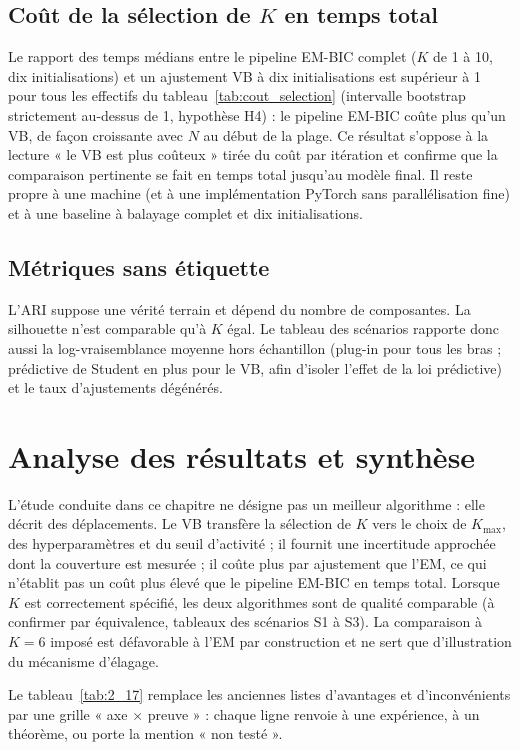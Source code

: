 \subsection{Coût de la sélection de $K$ en temps total}

Le rapport des temps médians entre le pipeline EM-BIC complet ($K$ de 1 à 10, dix initialisations) et un ajustement VB à dix initialisations est supérieur à 1 pour tous les effectifs du tableau~\ref{tab:cout_selection} (intervalle bootstrap strictement au-dessus de 1, hypothèse H4) : le pipeline EM-BIC coûte plus qu'un VB, de façon croissante avec $N$ au début de la plage. Ce résultat s'oppose à la lecture « le VB est plus coûteux » tirée du coût par itération et confirme que la comparaison pertinente se fait en temps total jusqu'au modèle final. Il reste propre à une machine (et à une implémentation PyTorch sans parallélisation fine) et à une baseline à balayage complet et dix initialisations.

\subsection{Métriques sans étiquette}
L'ARI suppose une vérité terrain et dépend du nombre de composantes. La silhouette n'est comparable qu'à $K$ égal. Le tableau des scénarios rapporte donc aussi la log-vraisemblance moyenne hors échantillon (plug-in pour tous les bras ; prédictive de Student en plus pour le VB, afin d'isoler l'effet de la loi prédictive) et le taux d'ajustements dégénérés.


\section{Analyse des résultats et synthèse}
L'étude conduite dans ce chapitre ne désigne pas un meilleur algorithme : elle décrit des déplacements. Le VB transfère la sélection de $K$ vers le choix de $K_{\max}$, des hyperparamètres et du seuil d'activité ; il fournit une incertitude approchée dont la couverture est mesurée ; il coûte plus par ajustement que l'EM, ce qui n'établit pas un coût plus élevé que le pipeline EM-BIC en temps total. Lorsque $K$ est correctement spécifié, les deux algorithmes sont de qualité comparable (à confirmer par équivalence, tableaux des scénarios S1 à S3). La comparaison à $K = 6$ imposé est défavorable à l'EM par construction et ne sert que d'illustration du mécanisme d'élagage.

Le tableau~\ref{tab:2_17} remplace les anciennes listes d'avantages et d'inconvénients par une grille « axe $\times$ preuve » : chaque ligne renvoie à une expérience, à un théorème, ou porte la mention « non testé ».

